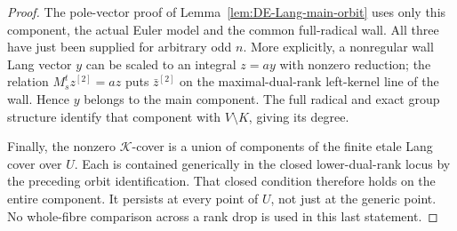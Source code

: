 \begin{proof}
The pole-vector proof of Lemma~\ref{lem:DE-Lang-main-orbit}
uses only this component, the actual Euler model and the common
full-radical wall. All three have just been supplied for arbitrary
odd \(n\). More explicitly, a nonregular wall Lang vector \(y\)
can be scaled to an integral \(z=ay\) with nonzero reduction;
the relation \(M_s^tz^{[2]}=az\) puts
\(\bar z^{[2]}\) on the maximal-dual-rank left-kernel line of
the wall. Hence \(y\) belongs to the main component. The full
radical and exact group structure identify that component with
\(V\setminus K\), giving its degree.

Finally, the nonzero \(\mathcal K\)-cover is a union of
components of the finite etale Lang cover over \(U\). Each is
contained generically in the closed lower-dual-rank locus by the
preceding orbit identification. That closed condition therefore
holds on the entire component. It persists at every point of
\(U\), not just at the generic point. No whole-fibre comparison
across a rank drop is used in this last statement.
\end{proof}

